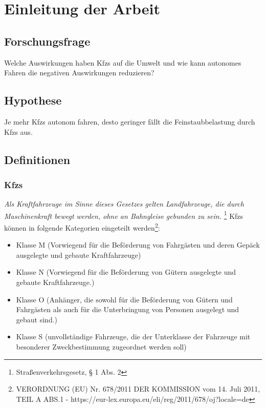 \chapter{Einleitung der Arbeit}

\section{Forschungsfrage}

Welche Auswirkungen haben \acfp{Kfz} auf die Umwelt und wie kann autonomes Fahren die negativen Auswirkungen reduzieren?

\section{Hypothese}

Je mehr \aclp{Kfz} autonom fahren, desto geringer fällt die Feinstaubbelastung durch \acfp{Kfz} aus.

\section{Definitionen}
\subsection{\acfp{Kfz}}

\textit{Als Kraftfahrzeuge im Sinne dieses Gesetzes gelten Landfahrzeuge, die durch Maschinenkraft bewegt werden, ohne an Bahngleise gebunden zu sein.}
\footnote{Straßenverkehrsgesetz, § 1 Abs. 2}
\vspace{0.5cm}
\newline
\aclp{Kfz} können in folgende Kategorien eingeteilt werden\footnote{VERORDNUNG (EU) Nr. 678/2011 DER KOMMISSION
	vom 14. Juli 2011, TEIL A ABS.1 - https://eur-lex.europa.eu/eli/reg/2011/678/oj?locale=de}:
\begin{itemize}
	\item Klasse M (Vorwiegend für die Beförderung von Fahrgästen und deren Gepäck ausgelegte und gebaute Kraftfahrzeuge)
	\item Klasse N (Vorwiegend für die Beförderung von Gütern ausgelegte und gebaute Kraftfahrzeuge.)
	\item Klasse O (Anhänger, die sowohl für die Beförderung von Gütern und Fahrgästen als auch für die Unterbringung von Personen ausgelegt und gebaut sind.)
	\item Klasse S (unvollständige Fahrzeuge, die der Unterklasse der Fahrzeuge mit besonderer Zweckbestimmung zugeordnet werden soll)
\end{itemize}


